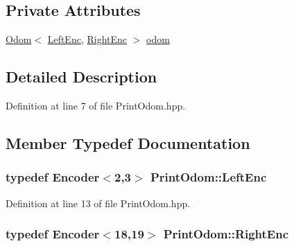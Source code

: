 \subsection*{Private Attributes}
\begin{DoxyCompactItemize}
\item 
\hyperlink{classOdom}{Odom}$<$ \hyperlink{classPrintOdom_a6888479f567846e63b00665fe95c4073}{Left\-Enc}, \hyperlink{classPrintOdom_ac090b58cc7388d8f2e26d5b7c912f383}{Right\-Enc} $>$ \hyperlink{classPrintOdom_a4741396ec009336b54896ade384b102d}{odom}
\end{DoxyCompactItemize}


\subsection{Detailed Description}


Definition at line 7 of file Print\-Odom.\-hpp.



\subsection{Member Typedef Documentation}
\hypertarget{classPrintOdom_a6888479f567846e63b00665fe95c4073}{
\subsubsection[{Left\-Enc}]{\setlength{\rightskip}{0pt plus 5cm}typedef {\bf Encoder}$<$2,3$>$ {\bf Print\-Odom\-::\-Left\-Enc}\hspace{0.3cm}{\ttfamily [private]}}}\label{classPrintOdom_a6888479f567846e63b00665fe95c4073}


Definition at line 13 of file Print\-Odom.\-hpp.

\hypertarget{classPrintOdom_ac090b58cc7388d8f2e26d5b7c912f383}{
\subsubsection[{Right\-Enc}]{\setlength{\rightskip}{0pt plus 5cm}typedef {\bf Encoder}$<$18,19$>$ {\bf Print\-Odom\-::\-Right\-Enc}\hspace{0.3cm}{\ttfamily [private]}}}\label{classPrintOdom_ac090b58cc7388d8f2e26d5b7c912f383}


